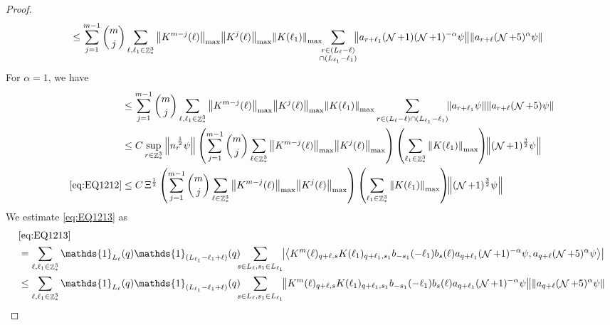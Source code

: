 \documentclass[sn-mathphys, Numbered ,a4paper]{sn-jnl}%
\DeclareMathOperator{\Z}{\mathbb{Z}}
\DeclareMathOperator{\NN}{\mathcal{N}}
\newcommand{\half}{\frac{1}{2}}
\newcommand{\eva}[1]{\left\langle #1 \right\rangle}
\theoremstyle{plain}
\theoremstyle{definition}
\theoremstyle{remark}
\theoremstyle{plain}
\theoremstyle{definition}
\theoremstyle{remark}
\begin{document}
\begin{proof}
\begin{alignat}{2}
	&\leq \sum\limits_{j=1}^{m-1} {{m}\choose j} \sum\limits_{\ell, \ell_1\in \Z^3_*} \norm{K^{m-j}(\ell)}_{\mathrm{max}} \norm{ K^{j}(\ell)}_{\mathrm{max}} \norm{ K(\ell_1) }_{\mathrm{max}}\!\!\! \sum\limits_{\substack{r\in (L_{\ell}-\ell)\\ \cap (L_{\ell_1}-\ell_1)}}\!\!\! \norm{ a_{r+\ell_1} (\NN+1) (\NN+1)^{-\alpha} \psi} \norm{a_{r+\ell} (\NN+5)^{\alpha}\psi }\nonumber
\end{alignat} 
For $\alpha = 1$, we have
\begin{align}
	&\leq \sum\limits_{j=1}^{m-1} {{m}\choose j} \sum\limits_{\ell, \ell_1\in \Z^3_*} \norm{K^{m-j}(\ell)}_{\mathrm{max}} \norm{ K^{j}(\ell)}_{\mathrm{max}} \norm{ K(\ell_1) }_{\mathrm{max}} \sum\limits_{\substack{r\in (L_{\ell}-\ell) \cap (L_{\ell_1}-\ell_1)}}\!\! \norm{ a_{r+\ell_1} \psi} \norm{ a_{r+\ell}(\NN+5) \psi }\nonumber\\
	&\leq C \sup\limits_{r \in \Z^3_*} \norm{ n^{\,\half}_r \psi} \left(  \sum\limits_{j=1}^{m-1} {{m}\choose j} \sum\limits_{\ell \in \Z^3_*} \norm{K^{m-j}(\ell)}_{\mathrm{max}} \norm{ K^{j}(\ell)}_{\mathrm{max}} \right) \left( \sum\limits_{ \ell_1\in \Z^3_*} \norm{ K(\ell_1) }_{\mathrm{max} } \right)\!\! \norm{(\NN+1)^{\frac{3}{2}} \psi }\nonumber\\
	\eqref{eq:EQ1212}&\leq C \, \Xi^\half \left(  \sum\limits_{j=1}^{m-1} {{m}\choose j} \sum\limits_{\ell \in \Z^3_*} \norm{K^{m-j}(\ell)}_{\mathrm{max}} \norm{ K^{j}(\ell)}_{\mathrm{max}}\right) \left( \sum\limits_{ \ell_1\in \Z^3_*}\norm{ K(\ell_1) }_{\mathrm{max}} \right)\!\! \norm{(\NN+1)^{\frac{3}{2}} \psi }\label{eq:estEQ1212}		
\end{align}
We estimate \eqref{eq:EQ1213} as
\begin{align}
	&\eqref{eq:EQ1213}\nonumber\\
	&= \sum\limits_{\ell, \ell_1\in \Z^3_*} \mathds{1}_{L_{\ell}}(q) \mathds{1}_{(L_{\ell_1}-\ell_1+\ell)}(q) \!\!\! \sum\limits_{s \in L_{\ell},s_1\in L_{\ell_1}}\!\! \abs{\eva{ K^m(\ell)_{q+\ell,s}K(\ell_1)_{q+\ell_1,s_1} b_{-s_1}(-\ell_1) b_{s}(\ell) a_{q+\ell_1} (\NN+1)^{-\alpha}\psi, a_{q+\ell} (\NN+5)^{\alpha} \psi }}\nonumber\\
	&\leq\sum\limits_{\ell, \ell_1\in \Z^3_*} \mathds{1}_{L_{\ell}}(q) \mathds{1}_{(L_{\ell_1}-\ell_1+\ell)}(q) \!\!\! \sum\limits_{s \in L_{\ell},s_1\in L_{\ell_1}}\!\! \norm{ K^m(\ell)_{q+\ell,s} K(\ell_1)_{q+\ell_1,s_1} b_{-s_1}(-\ell_1) b_{s}(\ell) a_{q+\ell_1} (\NN+1)^{-\alpha}\psi}\norm{ a_{q+\ell} (\NN+5)^{\alpha} \psi }\nonumber\\

\end{align}
\end{proof}
\end{document}
